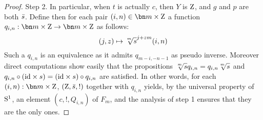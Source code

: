 \begin{proof}
  {\sc Step 2.} In particular, when $t$ is actually $c$, then $Y$ is $\mathrm{Z}$, and $g$
  and $p$ are both $\bar {s}$. Define then for each pair
  $(i,n)\in\bn m \times \zet$ a function
  $q_{i,n}:\bn m\times\zet \to \bn m\times\zet$ as follows:
  \begin{displaymath}
    (j,z) \mapsto \sqrt[\uproot{2}m]s^{j+zm}(i,n)%
  \end{displaymath}
  Such a $q_{i,n}$ is an equivalence as it admits $q_{m-i,-n-1}$ as
  pseudo inverse. Moreover direct computations show easily that the
  propositions $\sqrt[\uproot{2}m] s q_{i,n} = q_{i,n}\sqrt[\uproot{2}m] s$ and
  $q_{i,n} \circ (\mathord{\mathrm{id}} \times s) = (\mathord{\mathrm{id}} \times s) \circ q_{i,n}$ are
  satisfied. In other words, for each $(i,n):\bn m \times \zet$,
  $(\mathrm{Z},\bar {s},!)$ together with $q_{i,n}$ yields, by the universal
  property of ${\mathrm{S}^1}$, an element $(c,!,Q_{i,n})$ of $F_m$, and the
  analysis of step 1 ensures that they are the only ones.


\end{proof}
